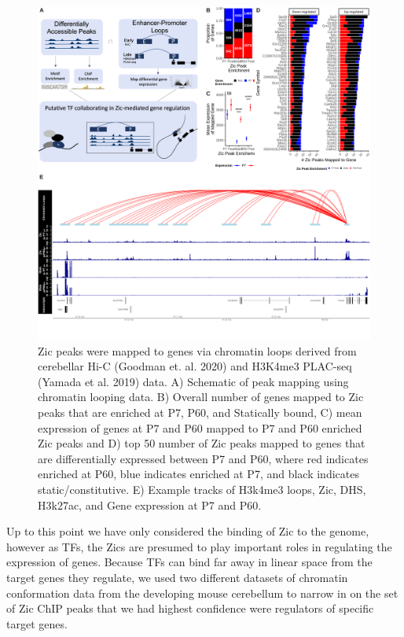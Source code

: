 \documentclass[fleqn,10pt]{wlscirep}
\begin{document}
\begin{figure}[!ht]
\includegraphics[width=.95\textwidth]{../figures/figure3.png}
\caption{Zic peaks were mapped to genes via chromatin loops derived from cerebellar Hi-C (Goodman et. al. 2020)\cite{Goodman2020TheBrain} and H3K4me3 PLAC-seq (Yamada et al. 2019)\cite{Yamada2019SensoryLearning} data. A) Schematic of peak mapping using chromatin looping data. B) Overall number of genes mapped to Zic peaks that are enriched at P7, P60, and Statically bound, C) mean expression of genes at P7 and P60 mapped to P7 and P60 enriched Zic peaks and D) top 50 number of Zic peaks mapped to genes that are differentially expressed between P7 and P60, where red indicates enriched at P60, blue indicates enriched at P7, and black indicates static/constitutive. E) Example tracks of H3k4me3 loops, Zic, DHS, H3k27ac, and Gene expression at P7 and P60.}
\label{fig:PeakMapping}
\end{figure}

Up to this point we have only considered the binding of Zic to the genome, however as TFs, the Zics are presumed to play important roles in regulating the expression of genes. Because TFs can bind far away in linear space from the target genes they regulate, we used two different datasets of chromatin conformation data from the developing mouse cerebellum to narrow in on the set of Zic ChIP peaks that we had highest confidence were regulators of specific target genes. 
\end{document}
